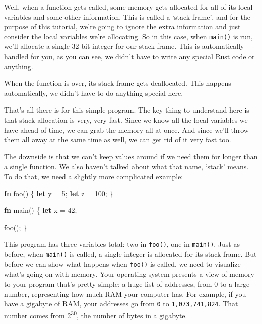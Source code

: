 \documentclass[a4paper,]{book}
\newenvironment{Shaded}{\begin{snugshade}}{\end{snugshade}}
\newcommand{\KeywordTok}[1]{\textcolor[rgb]{0.13,0.29,0.53}{\textbf{{#1}}}}
\newcommand{\DecValTok}[1]{\textcolor[rgb]{0.00,0.00,0.81}{{#1}}}
\newcommand{\NormalTok}[1]{{#1}}
\begin{document}
Well, when a function gets called, some memory gets allocated for all of
its local variables and some other information. This is called a `stack
frame', and for the purpose of this tutorial, we're going to ignore the
extra information and just consider the local variables we're
allocating. So in this case, when \texttt{main()} is run, we'll allocate
a single 32-bit integer for our stack frame. This is automatically
handled for you, as you can see, we didn't have to write any special
Rust code or anything.

When the function is over, its stack frame gets deallocated. This
happens automatically, we didn't have to do anything special here.

That's all there is for this simple program. The key thing to understand
here is that stack allocation is very, very fast. Since we know all the
local variables we have ahead of time, we can grab the memory all at
once. And since we'll throw them all away at the same time as well, we
can get rid of it very fast too.

The downside is that we can't keep values around if we need them for
longer than a single function. We also haven't talked about what that
name, `stack' means. To do that, we need a slightly more complicated
example:

\begin{Shaded}
\begin{Highlighting}[]
\KeywordTok{fn} \NormalTok{foo() \{}
    \KeywordTok{let} \NormalTok{y = }\DecValTok{5}\NormalTok{;}
    \KeywordTok{let} \NormalTok{z = }\DecValTok{100}\NormalTok{;}
\NormalTok{\}}

\KeywordTok{fn} \NormalTok{main() \{}
    \KeywordTok{let} \NormalTok{x = }\DecValTok{42}\NormalTok{;}

    \NormalTok{foo();}
\NormalTok{\}}
\end{Highlighting}
\end{Shaded}

This program has three variables total: two in \texttt{foo()}, one in
\texttt{main()}. Just as before, when \texttt{main()} is called, a
single integer is allocated for its stack frame. But before we can show
what happens when \texttt{foo()} is called, we need to visualize what's
going on with memory. Your operating system presents a view of memory to
your program that's pretty simple: a huge list of addresses, from 0 to a
large number, representing how much RAM your computer has. For example,
if you have a gigabyte of RAM, your addresses go from \texttt{0} to
\texttt{1,073,741,824}. That number comes from 2\textsuperscript{30},
the number of bytes in a gigabyte.
\end{document}

